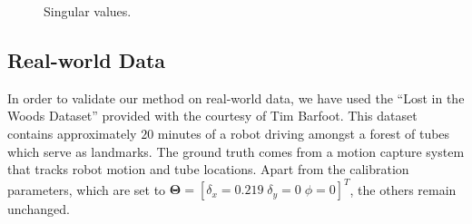 \begin{figure}[t]
\centering
{}
\caption{Singular values.}
\label{fig:sing_values}
\end{figure}

\subsection{Real-world Data}

In order to validate our method on real-world data, we have used the ``Lost in
the Woods Dataset'' provided with the courtesy of Tim Barfoot. This dataset
contains approximately $20$ minutes of a robot driving amongst a forest of
tubes which serve as landmarks. The ground truth comes from a motion capture
system that tracks robot motion and tube locations. Apart from the calibration
parameters, which are set to $\mathbf{\Theta}=[\delta_x=0.219\;\delta_y=0\;
\phi=0]^T$, the others remain unchanged.
